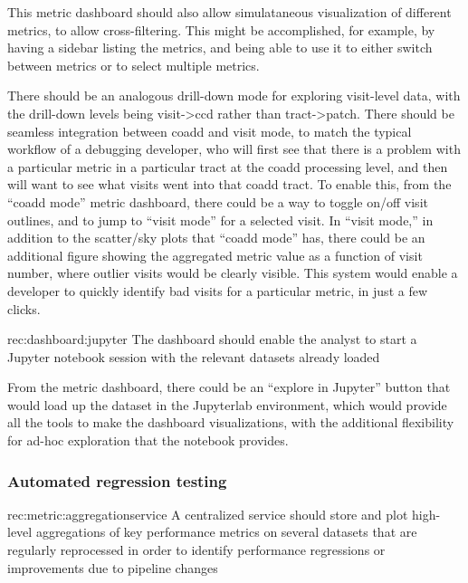 This metric dashboard should also allow simulataneous visualization of different metrics, to allow cross-filtering.
This might be accomplished, for example, by having a sidebar listing the metrics, and being able to use it to either switch between metrics or to select multiple metrics.

There should be an analogous drill-down mode for exploring visit-level data, with the drill-down levels being visit->ccd rather than tract->patch.
There should be seamless integration between coadd and visit mode, to match the typical workflow of a debugging developer, who will first see that there is a problem with a particular metric in a particular tract at the coadd processing level, and then will want to see what visits went into that coadd tract.
To enable this, from the ``coadd mode'' metric dashboard, there could be a way to toggle on/off visit outlines, and to jump to ``visit mode'' for a selected visit.
In ``visit mode,'' in addition to the scatter/sky plots that ``coadd mode'' has, there could be an additional figure showing the aggregated metric value as a function of visit number, where outlier visits would be clearly visible.
This system would enable a developer to quickly identify bad visits for a particular metric, in just a few clicks.


\begin{recommendation}
    {rec:dashboard:jupyter}
    {The dashboard should enable the analyst to start a Jupyter notebook session with the relevant datasets already loaded}
\end{recommendation}

From the metric dashboard, there could be an ``explore in Jupyter'' button that would load up the dataset in the Jupyterlab environment, which would provide all the tools to make the dashboard visualizations, with the additional flexibility for ad-hoc exploration that the notebook provides.


\subsubsection{Automated regression testing} \label{sec:regression}


\begin{recommendation}
    {rec:metric:aggregationservice}
    {A centralized service should store and plot high-level aggregations of key performance metrics on several datasets that are regularly reprocessed in order to identify performance regressions or improvements due to pipeline changes}
\end{recommendation}


